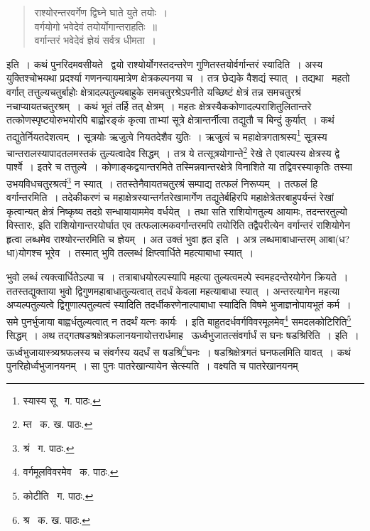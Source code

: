 \documentclass[11pt, openany]{book}
\begin{document}
\begin{quote}
{\qt राश्योरन्तरवर्गेण द्विघ्ने घाते युते तयोः~।\\
वर्गयोगो भवेदेवं तयोर्योगान्तराहतिः~॥\\
वर्गान्तरं भवेदेवं ज्ञेयं सर्वत्र धीमता~।}
\end{quote}

\noindent इति~। कथं पुनरिदमवसीयते \textendash\ द्वयो राश्योर्योगस्तदन्तरेण गुणितस्तयोर्वर्गान्तरं स्यादिति~। अस्य युक्तिश्चोभयथा प्रदर्श्या गणनन्यायमात्रेण क्षेत्रकल्पनया च~। तत्र छेद्यके वैशद्यं स्यात्~। तद्यथा \textendash\ महतो वर्गात्
तत्तुल्यचतुर्बाहोः क्षेत्रादल्पतुल्यबाहुके समचतुरश्रेऽपनीते यच्छिष्टं क्षेत्रं तन्न समचतुरश्रं नचाप्यायतचतुरश्रम्~। कथं भूतं तर्हि तत् क्षेत्रम्~। महतः
क्षेत्रस्यैककोणादल्पराशितुलितान्तरे तत्कोणस्पृष्टयोरुभयोरपि बाह्वोरङ्कं कृत्वा ताभ्यां सूत्रे क्षेत्रान्तर्नीत्वा तद्युतौ च बिन्दुं कुर्यात्~। कथं
तद्युतेर्नियतदेशत्वम्~। सूत्रयोः ऋजुत्वे नियतदेशैव युतिः~। ऋजुत्वं च महाक्षेत्रगताश्रस्य\renewcommand{\thefootnote}{१}\footnote{स्यास्य सू \textendash\ ग. पाठः.} सूत्रस्य चान्तरालस्यापादतलमस्तकं तुल्यत्वादेव सिद्धम्~। तत्र ये तत्सूत्रयोगान्ते\renewcommand{\thefootnote}{२}\footnote{म्त \textendash\ क. ख. पाठः.} रेखे ते एवाल्पस्य क्षेत्रस्य द्वे पार्श्वे~। इतरे च तत्तुल्ये~। कोणाङ्कद्वयान्तरमिते तस्मिन्नवान्तरक्षेत्रे विनाशिते या तद्विवरस्याकृतिः तस्या उभयविधचतुरश्रत्वं\renewcommand{\thefootnote}{३}\footnote{श्रं \textendash\ ग. पाठः.} न स्यात्~। ततस्तेनैवायतचतुरश्रं सम्पाद्य तत्फलं निरूप्यम्~। तत्फलं हि वर्गान्तरमिति~। तदेकीकरणं च महाक्षेत्रस्यान्तर्गतरेखामार्गेण तद्युतेर्बहिरपि महाक्षेत्रेतरबाहुपर्यन्तं रेखां कृत्वान्यत् क्षेत्रं निष्कृष्य तदग्रे सन्धायायाममेव वर्धयेत्~। तथा सति राशियोगतुल्य आयामः, तदन्तरतुल्यो विस्तारः, इति राशियोगान्तरयोर्घात एव तत्फलात्मकवर्गान्तरमपि तयोरिति तद्वैपरीत्येन वर्गान्तरं राशियोगेन हृत्वा लब्धमेव राश्योरन्तरमिति च ज्ञेयम्~। अत उक्तं भुवा हृत इति~। अत्र लब्धमाबाधान्तरम् आबा(ध?धा)योगश्च भूरेव~। तस्मात् भुवि तल्लब्धं क्षिप्त्वार्धिते महत्याबाधा स्यात्~। 

\newpage

\noindent भुवो लब्धं त्यक्त्वार्धितेऽल्पा च~। तत्राबाधयोरल्पस्यापि महत्या तुल्यत्वमल्पे स्वमहदन्तेरयोगेन क्रियते~। ततस्तद्युक्ताया भुवो
द्विगुणमहाबाधातुल्यत्वात् तदर्धं केवला महत्याबाधा स्यात्~। अन्तरत्यागेन महत्या अप्यल्पतुल्यत्वे द्विगुणाल्पतुल्यत्वं स्यादिति तदर्धीकरणेनाल्पाबाधा स्यादिति विषमे भुजाज्ञनोपायभूतं कर्म~। समे पुनर्भुजाया बाह्वर्धतुल्यत्वात् न तदर्थं यत्नः कार्यः~। इति बाहुतदर्धवर्गविवरमूलमेव\renewcommand{\thefootnote}{१}\footnote{वर्गमूलविवरमेव \textendash\ क. पाठः.} समदलकोटिरिति\renewcommand{\thefootnote}{२}\footnote{कोटीति \textendash\ ग. पाठः.} सिद्धम्~। अथ तद्गतषडश्रक्षेत्रफलानयनायोत्तरार्धमाह \textendash\ ऊर्ध्वभुजातत्संवर्गार्धं स घनः षडश्रिरिति~। इति~। ऊर्ध्वभुजायास्त्र्यश्रफलस्य च संवर्गस्य यदर्धं स षडश्रि\renewcommand{\thefootnote}{३}\footnote{श्र \textendash\ क. ख. पाठः.}घनः~। षडश्रिक्षेत्रगतं घनफलमिति यावत्~। कथं पुनरिहोर्ध्वभुजानयनम्~। सा पुनः पातरेखान्यायेन सेत्स्यति~। वक्ष्यति च पातरेखानयनम्\textendash 
\end{document}
